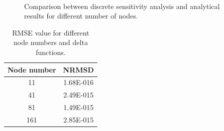 \begin{figure}[H]
	\centering
	\quad
	\\
	\quad
	\caption{Comparison between discrete sensitivity analysis and analytical results for different number of nodes.}
	\label{fig:C2_discreteSensitivityVerification}
\end{figure}

\begin{table}[H]
\centering
\begin{tabular}{c | c }
	 Node number & NRMSD \\ \hline \hline
	 11 & 1.68E-016 \\ \hline
	 41 & 2.49E-015 \\ \hline
	 81 & 1.49E-015 \\ \hline
	 161 & 2.85E-015 \\
\end{tabular}
\caption{RMSE value for different node numbers and delta functions.}
\label{table:C2_DSA_NRMSD}
\end{table}

